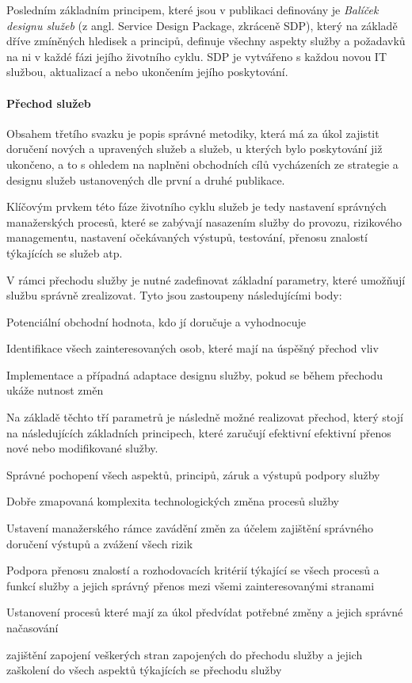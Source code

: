 \documentclass[
  digital,     %
  twoside,     %
  lof,         %
  lot,         %
]{fithesis4}
\begin{document}
Posledním základním principem, které jsou v publikaci definovány je  \emph{Balíček designu služeb} (z angl. Service Design Package, zkráceně SDP), který na základě dříve zmíněných hledisek a principů, definuje všechny aspekty služby a požadavků na ni v každé fázi jejího životního cyklu. SDP je vytvářeno s každou novou IT službou, aktualizací a nebo ukončením jejího poskytování.\parencite[s.~23]{Carlidge2007}
\paragraph{Přechod služeb}
Obsahem třetího svazku je popis správné metodiky, která má za úkol zajistit doručení nových a upravených služeb a služeb, u kterých bylo poskytování již ukončeno, a to s ohledem na naplněni obchodních cílů vycházeních ze strategie a designu služeb ustanovených dle první a druhé publikace.\parencite[s.~30]{Carlidge2007}

Klíčovým prvkem této fáze životního cyklu služeb je tedy nastavení správných manažerských procesů, které se zabývají nasazením služby do provozu, rizikového managementu, nastavení očekávaných výstupů, testování, přenosu znalostí týkajících se služeb atp.\parencite[s.~30]{Carlidge2007}

V rámci přechodu služby je nutné zadefinovat základní parametry, které umožňují službu správně zrealizovat. Tyto jsou zastoupeny následujícími body:\parencite[s.~30]{Carlidge2007}
\begin{compactitem}
    \item Potenciální obchodní hodnota, kdo jí doručuje a vyhodnocuje
    \item Identifikace všech zainteresovaných osob, které mají na úspěšný přechod vliv
    \item Implementace a případná adaptace designu služby, pokud se během přechodu ukáže nutnost změn
\end{compactitem}

Na základě těchto tří parametrů je následně možné realizovat přechod, který stojí na následujících základních principech, které zaručují efektivní efektivní přenos nové nebo modifikované služby. \parencite[s.~30]{Carlidge2007}
\begin{compactitem}
    \item Správné pochopení všech aspektů, principů, záruk a výstupů podpory služby
    \item Dobře zmapovaná komplexita technologických změna  procesů služby
    \item Ustavení manažerského rámce zavádění změn za účelem zajištění správného doručení výstupů a zvážení všech rizik
    \item Podpora přenosu znalostí a rozhodovacích kritérií týkající se všech procesů a funkcí služby a jejich správný přenos mezi všemi zainteresovanými stranami
    \item Ustanovení procesů které mají za úkol předvídat potřebné změny a jejich správné načasování
    \item zajištění zapojení veškerých stran zapojených do přechodu služby a jejich zaškolení do všech aspektů týkajících se přechodu služby
\end{compactitem}
\end{document}
